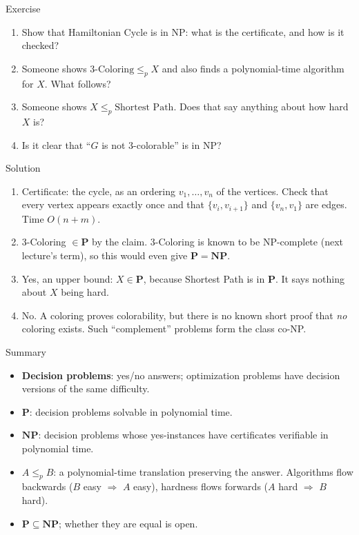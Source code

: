 \documentclass[10pt,aspectratio=169]{beamer}
\begin{document}
\begin{frame}{Exercise}
  \begin{enumerate}
    \item Show that Hamiltonian Cycle is in NP: what is the certificate, and
          how is it checked?
    \item Someone shows $\text{3-Coloring} \le_p X$ and also finds a
          polynomial-time algorithm for $X$. What follows?
    \item Someone shows $X \le_p \text{Shortest Path}$. Does that say
          anything about how hard $X$ is?
    \item Is it clear that ``$G$ is \alert{not} 3-colorable'' is in NP?
  \end{enumerate}
\end{frame}

\begin{frame}{Solution}
  \small
  \begin{enumerate}
    \item Certificate: the cycle, as an ordering $v_1, \ldots, v_n$ of the
          vertices. Check that every vertex appears exactly once and that
          $\{v_i, v_{i+1}\}$ and $\{v_n, v_1\}$ are edges. Time $O(n + m)$.
    \item 3-Coloring $\in \mathbf{P}$ by the claim. 3-Coloring is known
          to be NP-complete (next lecture's term), so this would even give
          $\mathbf{P} = \mathbf{NP}$.
    \item Yes, an upper bound: $X \in \mathbf{P}$, because Shortest Path is
          in $\mathbf{P}$. It says nothing about $X$ being hard.
    \item No. A coloring proves colorability, but there is no known short
          proof that \emph{no} coloring exists. Such ``complement'' problems
          form the class co-NP.
  \end{enumerate}
\end{frame}

\begin{frame}{Summary}
  \begin{itemize}
    \item \textbf{Decision problems}: yes/no answers; optimization problems
          have decision versions of the same difficulty.
    \item $\mathbf{P}$: decision problems \alert{solvable} in polynomial
          time.
    \item $\mathbf{NP}$: decision problems whose yes-instances have
          certificates \alert{verifiable} in polynomial time.
    \item $A \le_p B$: a polynomial-time translation preserving the answer.
          Algorithms flow backwards ($B$ easy $\Rightarrow$ $A$ easy),
          hardness flows forwards ($A$ hard $\Rightarrow$ $B$ hard).
    \item $\mathbf{P} \subseteq \mathbf{NP}$; whether they are equal is open.
  \end{itemize}
\end{frame}
\end{document}
